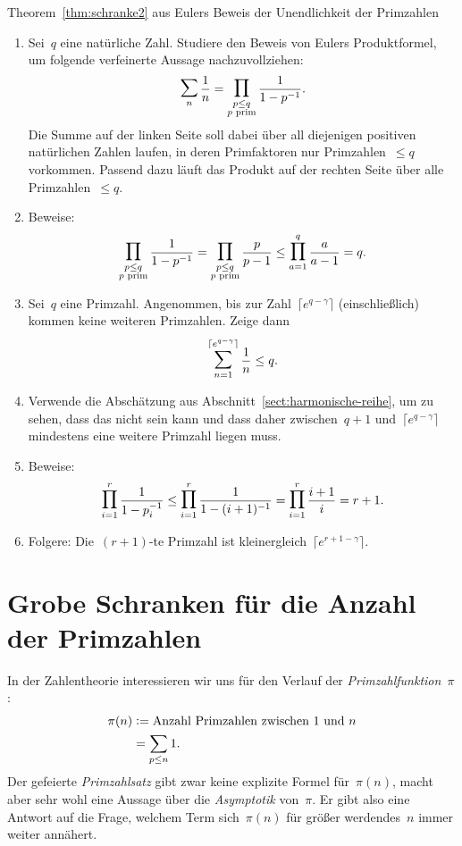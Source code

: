 \documentclass[twoside]{../zirkelblatt1415}
\theoremstyle{definition}
\theoremstyle{plain}
\theoremstyle{remark}
\newcommand{\defeq}{\vcentcolon=}
\newcommand{\prim}[1]{\text{\textnormal{$#1$ prim}}}
\newcommand{\bigsum}{\mathop{\mathlarger{\mathlarger{\sum}}}}
\newcommand{\bigprod}{\mathop{\mathlarger{\mathlarger{\prod}}}}
\begin{document}
\begin{aufgabe}{Theorem~\ref{thm:schranke2} aus Eulers Beweis der
Unendlichkeit der Primzahlen}
\begin{enumerate}
\item Sei~$q$ eine natürliche Zahl. Studiere den Beweis von Eulers
Produktformel, um folgende verfeinerte Aussage nachzuvollziehen:
\[ \bigsum_n \frac{1}{n} = \bigprod_{\substack{p \leq q \\ \prim{p}}} \frac{1}{1 -
p^{-1}}. \]
Die Summe auf der linken Seite soll dabei über all diejenigen positiven
natürlichen Zahlen laufen, in deren Primfaktoren nur Primzahlen~$\leq q$
vorkommen. Passend dazu läuft das Produkt auf der rechten Seite über alle
Primzahlen~$\leq q$.
\item Beweise:
\[
  \bigprod_{\substack{p \leq q \\ \prim{p}}} \frac{1}{1 - p^{-1}} =
  \bigprod_{\substack{p \leq q \\ \prim{p}}} \frac{p}{p - 1} \leq
  \bigprod_{a=1}^q \frac{a}{a - 1} = q. \]
\item Sei~$q$ eine Primzahl. Angenommen, bis zur Zahl~$\lceil e^{q-\gamma}
\rceil$ (einschließlich) kommen keine weiteren Primzahlen. Zeige dann
\[ \bigsum_{n=1}^{\lceil e^{q-\gamma} \rceil} \frac{1}{n} \leq q. \]
\item Verwende die Abschätzung aus Abschnitt~\ref{sect:harmonische-reihe}, um
zu sehen, dass das nicht sein kann und dass daher zwischen~$q+1$ und~$\lceil
e^{q-\gamma} \rceil$ mindestens eine weitere Primzahl liegen muss.
\item Beweise:
\[
  \bigprod_{i=1}^r \frac{1}{1 - p_i^{-1}} \leq
  \bigprod_{i=1}^r \frac{1}{1 - (i+1)^{-1}} =
  \bigprod_{i=1}^r \frac{i+1}{i} = r+1. \]
\item Folgere: Die~$(r+1)$-te Primzahl ist kleinergleich~$\lceil e^{r+1-\gamma} \rceil$.
\end{enumerate}\fixlistspacing
\end{aufgabe}


\section{Grobe Schranken für die Anzahl der Primzahlen}

In der Zahlentheorie interessieren wir uns für den Verlauf der
\emph{Primzahlfunktion}~$\pi$:
\begin{align*}
  \pi(n) &\defeq \text{Anzahl Primzahlen zwischen $1$ und $n$} \\
  &= \sum_{p \leq n} 1.
\end{align*}
Der gefeierte \emph{Primzahlsatz} gibt zwar keine explizite Formel für~$\pi(n)$,
macht aber sehr wohl eine Aussage über die \emph{Asymptotik} von~$\pi$. Er gibt
also eine Antwort auf die Frage, welchem Term sich~$\pi(n)$ für größer
werdendes~$n$ immer weiter annähert.
\end{document}
